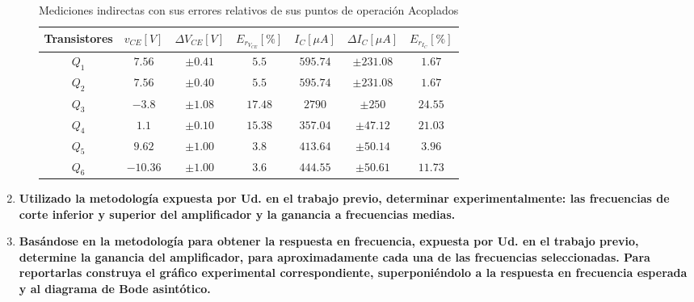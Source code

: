 \begin{enumerate}
\begin{itemize}
                \begin{table}[H]
                  \centering
                  \begin{tabular}{|c|c|c|c|c|c|c|}
                    \hline
                    \textbf{Transistores} & $v_{CE} [V]$ & $\Delta V_{CE} [V]$ & $E_{r_{V_{CE}}} [\%]$ & $I_{C} [\mu A]$ & $\Delta I_{C} [\mu A]$ & $E_{r_{I_{C}}} [\%]$ \\
                    \hline
                    $Q_1$                 & $7.56$       & $\pm 0.41 $         & $5.5$                 & $595.74$        & $\pm 231.08$           & $1.67$               \\
                    \hline
                    $Q_2$                 & $7.56$       & $\pm 0.40 $         & $5.5$                 & $595.74$        & $\pm 231.08$           & $1.67$               \\
                    \hline
                    $Q_3$                 & $-3.8$       & $\pm 1.08$          & $17.48$               & $2790$          & $\pm 250$              & $24.55$              \\
                    \hline
                    $Q_4$                 & $1.1$        & $\pm 0.10$          & $15.38$               & $357.04$        & $\pm 47.12$            & $21.03$              \\
                    \hline
                    $Q_5$                 & $9.62$       & $\pm 1.00$          & $3.8$                 & $413.64$        & $\pm 50.14$            & $3.96$               \\
                    \hline
                    $Q_6$                 & $-10.36$     & $\pm 1.00$          & $3.6$                 & $444.55$        & $\pm 50.61$            & $11.73$              \\
                    \hline
                  \end{tabular}
                  \caption{Mediciones indirectas con sus errores relativos de sus puntos de operación Acoplados}
                  \label{tab:puntos_operacion_experimental_maserror_parte34}
                \end{table}

        \end{itemize}

  \item \textbf{Utilizado la metodología expuesta por Ud. en el trabajo
          previo, determinar experimentalmente: las frecuencias
          de corte inferior y superior del amplificador y la ganancia a frecuencias medias.}
  \item \textbf{Basándose en la metodología para obtener la respuesta
          en frecuencia, expuesta por Ud. en el trabajo previo, determine la ganancia del amplificador, para
          aproximadamente cada una de las frecuencias seleccionadas.
          Para reportarlas construya el gráfico experimental
          correspondiente, superponiéndolo a la respuesta
          en frecuencia esperada y al diagrama de Bode asintótico.}


\end{enumerate}
